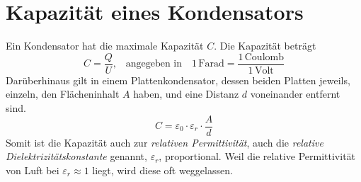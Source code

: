 \documentclass{article}
\begin{document}
\section{Kapazität eines Kondensators}
Ein Kondensator hat die maximale Kapazität $C$. Die Kapazität beträgt
\[
 C = \frac{Q}{U} \text{,}
 \quad \text{angegeben in} \quad
 1 \,\text{Farad} = \frac{1 \,\text{Coulomb}}{1 \,\text{Volt}} 
\]
Darüberhinaus gilt in einem Plattenkondensator, dessen beiden Platten jeweils, einzeln, den Flächeninhalt $A$ haben, und eine Distanz $d$ voneinander entfernt sind.
\[
 C = \varepsilon_0 \cdot \varepsilon_r \cdot \frac{A}{d} 
\]
Somit ist die Kapazität auch zur \emph{relativen Permittivität}, auch die \emph{relative Dielektrizitätskonstante} genannt, $\varepsilon_r$, proportional. Weil die relative Permittivität von Luft bei $\varepsilon_r \approx 1$ liegt, wird diese oft weggelassen.
\end{document}
